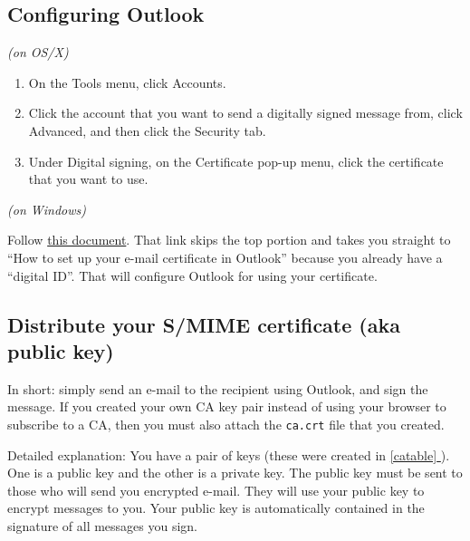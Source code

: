 \documentclass[pdftex,12pt,titlepage=false]{scrartcl}
\newcommand*{\fullref}[1]{\hyperref[{#1}]{\autoref*{#1} \nameref*{#1}}}
\begin{document}
\subsection{Configuring Outlook}\label{outlookcfg}
\begin{minipage}[t]{0.48\textwidth}
  \centerline{\textsl{(on OS/X)}}
  \begin{enumerate}
  \item On the Tools menu, click Accounts.
  \item Click the account that you want to send a digitally signed message from, click Advanced, and then click the Security tab.
  \item Under Digital signing, on the Certificate pop-up menu, click the certificate that you want to use.
  \end{enumerate}
\end{minipage}\hfill%
\begin{minipage}[t]{0.48\textwidth}
  \centerline{\textsl{(on Windows)}}\vspace{0.5em}Follow
  \href{https://www.ablebits.com/office-addins-blog/2014/04/11/email-encryption-outlook/#setup-email-certificate}{this
    document}.  That link skips the top portion and takes you straight
  to ``How to set up your e-mail certificate in Outlook'' because you
  already have a ``digital ID''.  That will configure Outlook for
  using your certificate.
\end{minipage}


\subsection{Distribute your S/MIME certificate (aka public key)}\label{distribution}
In short: simply send an e-mail to the recipient using Outlook, and
sign the message. If you created your own CA key pair instead of using
your browser to subscribe to a CA, then you must also attach the
\verb|ca.crt| file that you created.

Detailed explanation: You have a pair of keys (these were created in
\fullref{catable}).  One is a public key and the other is a private
key.  The public key must be sent to those who will send you encrypted
e-mail.  They will use your public key to encrypt messages to you.
Your public key is automatically contained in the signature of all
messages you sign.
\end{document}
